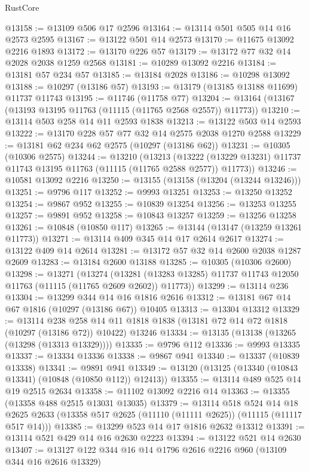 \begin{lexlean}{RustCore}
\begin{coremodule}
@13158 := @13109 @506 @17 @2596
@13164 := @13114 @501 @505 @14 @16 @2573 @2595
@13167 := @13122 @501 @14 @2573
@13170 := @11675 @13092 @2216 @1893
@13172 := @13170 @226 @57
@13179 := @13172 @77 @32 @14 @2028 @2038 @1259 @2568
@13181 := @10289 @13092 @2216
@13184 := @13181 @57 @234 @57
@13185 := @13184 @2028
@13186 := @10298 @13092
@13188 := @10297 (@13186 @57)
@13193 := @13179 (@13185 @13188 @11699) @11737 @11743
@13195 := @11746 (@11758 @77)
@13204 := @13164 (@13167 (@13193 @13195 @11763 (@11115 (@11765 @2568 @2557)) @11773))
@13210 := @13114 @503 @258 @14 @11 @2593 @1838
@13213 := @13122 @503 @14 @2593
@13222 := @13170 @228 @57 @77 @32 @14 @2575 @2038 @1270 @2588
@13229 := @13181 @62 @234 @62 @2575 (@10297 (@13186 @62))
@13231 := @10305 (@10306 @2575)
@13244 := @13210
    (@13213
      (@13222 (@13229 @13231) @11737 @11743 @13195 @11763 (@11115 (@11765 @2588 @2577)) @11773))
@13246 := @10581 @13092 @2216
@13250 := @13155 (@13158 (@13204 (@13244 @13246)))
@13251 := @9796 @117
@13252 := @9993 @13251
@13253 := @13250 @13252
@13254 := @9867 @952
@13255 := @10839 @13254
@13256 := @13253 @13255
@13257 := @9891 @952
@13258 := @10843 @13257
@13259 := @13256 @13258
@13261 := @10848 (@10850 @117)
@13265 := @13144 (@13147 (@13259 @13261 @11773))
@13271 := @13114 @409 @345 @14 @17 @2614 @2617
@13274 := @13122 @409 @14 @2614
@13281 := @13172 @57 @32 @14 @2600 @2038 @1287 @2609
@13283 := @13184 @2600 @13188
@13285 := @10305 (@10306 @2600)
@13298 := @13271
    (@13274
      (@13281 (@13283 @13285) @11737 @11743 @12050 @11763 (@11115 (@11765 @2609 @2602)) @11773))
@13299 := @13114 @236
@13304 := @13299 @344 @14 @16 @1816 @2616
@13312 := @13181 @67 @14 @67 @1816 (@10297 (@13186 @67)) @10405
@13313 := @13304 @13312
@13329 := @13114
    @238
    @258
    @14
    @11
    @1818
    @1838
    (@13181 @72 @14 @72 @1818 (@10297 (@13186 @72)) @10422)
    @13246
@13334 := @13135 (@13138 (@13265 (@13298 (@13313 @13329))))
@13335 := @9796 @112
@13336 := @9993 @13335
@13337 := @13334 @13336
@13338 := @9867 @941
@13340 := @13337 (@10839 @13338)
@13341 := @9891 @941
@13349 := @13120 (@13125 (@13340 (@10843 @13341) (@10848 (@10850 @112)) @12413))
@13355 := @13114 @489 @525 @14 @19 @2515 @2634
@13358 := @11102 @13092 @2216 @14
@13363 := @13355 (@13358 @488 @2515 @13031 @13035)
@13379 := @13114
    @518
    @524
    @14
    @18
    @2625
    @2633
    (@13358 @517 @2625 (@11110 (@11111 @2625)) (@11115 (@11117 @517 @14)))
@13385 := @13299 @523 @14 @17 @1816 @2632 @13312
@13391 := @13114 @521 @429 @14 @16 @2630 @2223
@13394 := @13122 @521 @14 @2630
@13407 := @13127 @122 @344 @16 @14 @1796 @2616 @2216 @960 (@13109 @344 @16 @2616 @13329)

\end{coremodule}
\end{lexlean}
